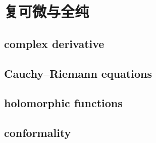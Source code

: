 \section{复可微与全纯}
\label{b3:sec:0101}


\subsection{complex derivative}
\label{b3:subsec:010101}

\subsection{Cauchy–Riemann equations}
\label{b3:subsec:010102}

\subsection{holomorphic functions}
\label{b3:subsec:010103}

\subsection{conformality}
\label{b3:subsec:010104}


